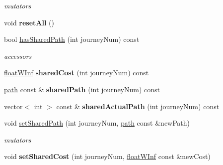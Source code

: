 \begin{DoxyCompactItemize}
\begin{DoxyCompactList}\small\item\em mutators \end{DoxyCompactList}\item 
\hypertarget{classjourneyGroup_abeeade99f92481899b2ade8e3b9bad63}{
void {\bfseries resetAll} ()}
\label{classjourneyGroup_abeeade99f92481899b2ade8e3b9bad63}

\item 
\hypertarget{classjourneyGroup_af68fc2de3e877c379083392dc3279d8b}{
bool \hyperlink{classjourneyGroup_af68fc2de3e877c379083392dc3279d8b}{hasSharedPath} (int journeyNum) const }
\label{classjourneyGroup_af68fc2de3e877c379083392dc3279d8b}

\begin{DoxyCompactList}\small\item\em accessors \end{DoxyCompactList}\item 
\hypertarget{classjourneyGroup_aa5749c94101001dadfa73490cc2b5b5e}{
\hyperlink{classfloatWInf}{floatWInf} {\bfseries sharedCost} (int journeyNum) const }
\label{classjourneyGroup_aa5749c94101001dadfa73490cc2b5b5e}

\item 
\hypertarget{classjourneyGroup_ad3ac8bcdf40479d0f5cb2bb23d81efb0}{
\hyperlink{classpath}{path} const \& {\bfseries sharedPath} (int journeyNum) const }
\label{classjourneyGroup_ad3ac8bcdf40479d0f5cb2bb23d81efb0}

\item 
\hypertarget{classjourneyGroup_a15eb55fa3469f70a05e7653c474af67e}{
vector$<$ int $>$ const \& {\bfseries sharedActualPath} (int journeyNum) const }
\label{classjourneyGroup_a15eb55fa3469f70a05e7653c474af67e}

\item 
\hypertarget{classjourneyGroup_a25f60bff8ea6ae171b787c361c97bfd0}{
void \hyperlink{classjourneyGroup_a25f60bff8ea6ae171b787c361c97bfd0}{setSharedPath} (int journeyNum, \hyperlink{classpath}{path} const \&newPath)}
\label{classjourneyGroup_a25f60bff8ea6ae171b787c361c97bfd0}

\begin{DoxyCompactList}\small\item\em mutators \end{DoxyCompactList}\item 
\hypertarget{classjourneyGroup_a853b5d0f757dfe16cf5e97962be9f845}{
void {\bfseries setSharedCost} (int journeyNum, \hyperlink{classfloatWInf}{floatWInf} const \&newCost)}
\label{classjourneyGroup_a853b5d0f757dfe16cf5e97962be9f845}


\end{DoxyCompactItemize}
